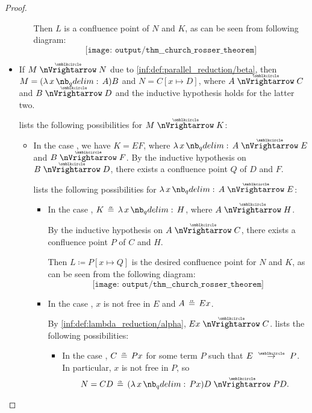 \begin{proof}
\begin{itemize}
\begin{itemize}
      Then \( L \) is a confluence point of \( N \) and \( K \), as can be seen from following diagram:
      \begin{equation*}
        \texttt{[image: output/thm\_\_church\_rosser\_theorem]}
      \end{equation*}
    \end{itemize}

    \item If \( M \ppred N \) due to \ref{inf:def:parallel_reduction/beta}, then \( M = (\qabs x A)B \) and \( N = C[x \mapsto D] \), where \( A \ppred C \) and \( B \ppred D \) and the inductive hypothesis holds for the latter two.

     lists the following possibilities for \( M \ppred K \):
    \begin{itemize}
      \item In the case , we have \( K = EF \), where \( \qabs x A \ppred E \) and \( B \ppred F \). By the inductive hypothesis on \( B \ppred D \), there exists a confluence point \( Q \) of \( D \) and \( F \).

       lists the following possibilities for \( \qabs x A \ppred E \):
      \begin{itemize}
        \item In the case , \( K \aequiv \qabs x H \), where \( A \ppred H \).

        By the inductive hypothesis on \( A \ppred C \), there exists a confluence point \( P \) of \( C \) and \( H \).

        Then \( L \coloneqq P[x \mapsto Q] \) is the desired confluence point for \( N \) and \( K \), as can be seen from the following diagram:
        \begin{equation*}
          \texttt{[image: output/thm\_\_church\_rosser\_theorem]}
        \end{equation*}

        \item In the case , \( x \) is not free in \( E \) and \( A \aequiv Ex \).

        By \ref{inf:def:lambda_reduction/alpha}, \( Ex \ppred C \).  lists the following possibilities:
        \begin{itemize}
          \item In the case , \( C \aequiv Px \) for some term \( P \) such that \( E \pred P \). In particular, \( x \) is not free in \( P \), so
          \begin{equation*}
            N = CD \aequiv (\qabs x P x) D \ppred PD.
          \end{equation*}


\end{itemize}
\end{itemize}
\end{itemize}
\end{itemize}
\end{proof}
